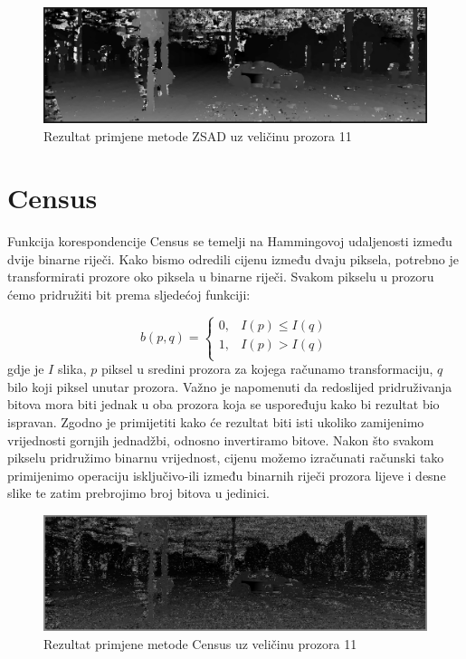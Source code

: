 \documentclass[utf8, zavrsni, numeric]{fer}
\begin{document}
\begin{figure}[htb]
  \centering
  \includegraphics[width=14cm]{img/local_000046_10_ZSAD_11_140_scaled.png}
  \caption{Rezultat primjene metode ZSAD uz veličinu prozora 11}
  \label{fig:ZSAD-KITTI}
\end{figure}

\section{Census}

Funkcija korespondencije Census se temelji na Hammingovoj udaljenosti između dvije binarne riječi. Kako bismo odredili cijenu između dvaju piksela, potrebno je transformirati
prozore oko piksela u binarne riječi. Svakom pikselu u prozoru ćemo pridružiti bit prema sljedećoj funkciji:

\[   
b(p, q) = 
     \begin{cases}
       0, & I(p) \leq I(q) \\
       1, & I(p) > I(q) \\
     \end{cases}
\]
gdje je $I$ slika, $p$ piksel u sredini prozora za kojega računamo transformaciju, $q$ bilo koji piksel unutar prozora. Važno je napomenuti da redoslijed pridruživanja bitova mora biti jednak u oba
prozora koja se uspoređuju kako bi rezultat bio ispravan. Zgodno je primijetiti kako će
rezultat biti isti ukoliko zamijenimo vrijednosti gornjih jednadžbi, odnosno invertiramo bitove. Nakon što svakom pikselu pridružimo binarnu vrijednost, cijenu možemo izračunati
računski tako primijenimo operaciju isključivo-ili između binarnih riječi prozora lijeve i desne slike te zatim prebrojimo broj bitova u jedinici.

\begin{figure}[htb]
  \centering
  \includegraphics[width=14cm]{img/local_000046_10_Census_11_140.png}
  \caption{Rezultat primjene metode Census uz veličinu prozora 11}
  \label{fig:Census-KITTI}
\end{figure}
\end{document}
